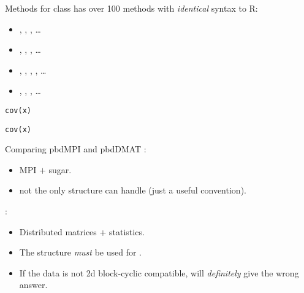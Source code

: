 \begin{frame}[fragile]
  \begin{block}{Methods for class }\pause
     has over 100 methods with \emph{identical} syntax to R:
    \begin{itemize}
     \item \code{\`{}[\`{}}, , , \dots
     \item {}, , , \dots
     \item \code{\`{}\%*\%\`{}}, , , , \dots
     \item {}, , , \dots
    \end{itemize}
\begin{lstlisting}[title=Serial Code]
cov(x)
\end{lstlisting}
  
\begin{lstlisting}[title=Parallel Code]
cov(x)
\end{lstlisting}
  \end{block}
\end{frame}

\begin{frame}[fragile]
  \begin{block}{Comparing pbdMPI and pbdDMAT}\pause
{}:
  \begin{itemize}
     \item MPI $+$ sugar.
     \item {} not the only structure  can handle (just a useful convention).
     \end{itemize}
     
     :
     \begin{itemize}
     \item Distributed matrices + statistics.
     \item The  structure \emph{must} be used for .
     \item If the data is not 2d block-cyclic compatible,  will \emph{definitely} give the 
wrong 
answer.
    \end{itemize}
  \end{block}
\end{frame}
